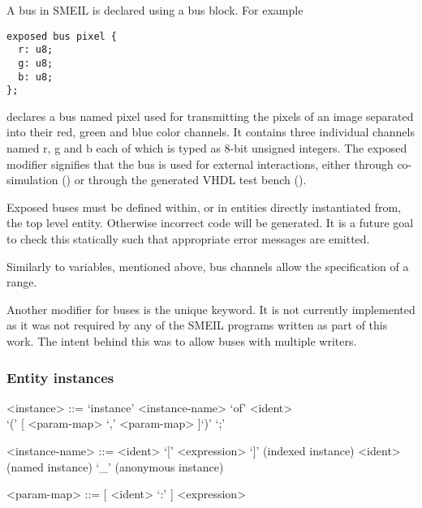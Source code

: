A bus in SMEIL is declared using a {\ttfamily bus} block. For example
\begin{lstlisting}[language=smeil]
exposed bus pixel {
  r: u8;
  g: u8;
  b: u8;
};
\end{lstlisting}
declares a bus named {\ttfamily pixel} used for transmitting the pixels of an
image separated into their red, green and blue color channels. It contains three
individual channels named {\ttfamily r}, {\ttfamily g} and {\ttfamily b} each of
which is typed as 8-bit unsigned integers. The {\ttfamily exposed} modifier
signifies that the bus is used for external interactions, either through
co-simulation () or through the generated VHDL test bench
().

Exposed buses must be defined within, or in entities directly instantiated from,
the top level entity. Otherwise incorrect code will be generated. It is a future
goal to check this statically such that appropriate error messages are emitted.

Similarly to variables, mentioned above, bus channels allow the specification of
a {\ttfamily range}.

Another modifier for buses is the {\ttfamily unique} keyword. It is not
currently implemented as it was not required by any of the SMEIL programs
written as part of this work. The intent behind this was to allow buses with
multiple writers. 



\subsubsection{Entity instances}
\label{sec:instance}
\begin{grammar}
  <instance> ::= `instance' <instance-name> `of' <ident> \\`(' [ <param-map> { `,' <param-map> } ]`)' `;'

  <instance-name> ::= <ident> `[' <expression> `]' (indexed instance)
  \alt <ident> (named instance)
  \alt `_' (anonymous instance)

  <param-map> ::= [ <ident> `:' ] <expression>

\end{grammar}

